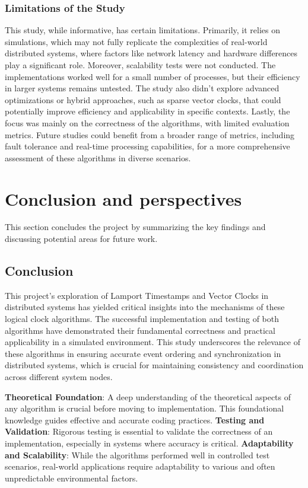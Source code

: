 \documentclass{article}
\begin{document}
\subsubsection{Limitations of the Study}
This study, while informative, has certain limitations. Primarily, it relies on simulations, which may not fully replicate the complexities of real-world distributed systems, where factors like network latency and hardware differences play a significant role. Moreover, scalability tests were not conducted. The implementations worked well for a small number of processes, but their efficiency in larger systems remains untested. The study also didn't explore advanced optimizations or hybrid approaches, such as sparse vector clocks\cite{sparse}, that could potentially improve efficiency and applicability in specific contexts. Lastly, the focus was mainly on the correctness of the algorithms, with limited evaluation metrics. Future studies could benefit from a broader range of metrics, including fault tolerance and real-time processing capabilities, for a more comprehensive assessment of these algorithms in diverse scenarios.
\section{Conclusion and perspectives}
  This section concludes the project by summarizing the key findings and discussing potential areas for future work.
  \subsection{Conclusion}
  This project's exploration of Lamport Timestamps and Vector Clocks in distributed systems has yielded critical insights into the mechanisms of these logical clock algorithms. The successful implementation and testing of both algorithms have demonstrated their fundamental correctness and practical applicability in a simulated environment. This study underscores the relevance of these algorithms in ensuring accurate event ordering and synchronization in distributed systems, which is crucial for maintaining consistency and coordination across different system nodes.

  \textbf{Theoretical Foundation}: A deep understanding of the theoretical aspects of any algorithm is crucial before moving to implementation. This foundational knowledge guides effective and accurate coding practices.
  \textbf{Testing and Validation}: Rigorous testing is essential to validate the correctness of an implementation, especially in systems where accuracy is critical.
  \textbf{Adaptability and Scalability}: While the algorithms performed well in controlled test scenarios, real-world applications require adaptability to various and often unpredictable environmental factors.
\end{document}
